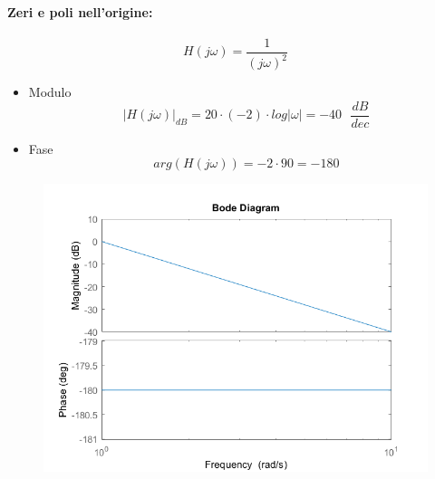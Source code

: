 \documentclass[a4paper]{article}
\begin{document}
	\newpage
	\paragraph{Zeri e poli nell'origine:}
	\[ H(j\omega)=\frac{1}{(j\omega)^2} \]
	\begin{itemize}
		\item Modulo
			\[ |H(j\omega)|_{dB} = 20 \cdot (-2) \cdot log|\omega| = -40 \text{ } \frac{dB}{dec}  \]
		\item Fase
			\[ arg(H(j\omega)) = -2 \cdot 90 = -180 \]
	\end{itemize}
	\begin{figure}[h]
		\centering
		\includegraphics[scale=0.5]{origine}
		\label{fig:origine}
	\end{figure}
	
\end{document}
